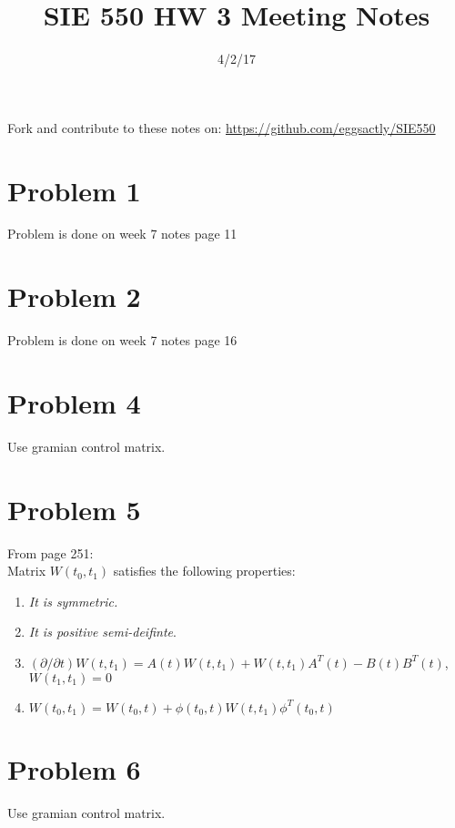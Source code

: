 \documentclass[12pt]{article}
\begin{document}
\title{SIE 550 HW 3 Meeting Notes}
\date{4/2/17}

\maketitle

Fork and contribute to these notes on: \url{https://github.com/eggsactly/SIE550}

\section*{Problem 1}
Problem is done on week 7 notes page 11

\section*{Problem 2}
Problem is done on week 7 notes page 16

\section*{Problem 4}
Use gramian control matrix. 

\section*{Problem 5} 
From page 251:\\
Matrix $W(t_0,t_1)$ satisfies the following properties:
\renewcommand{\labelenumiii}{\Roman{enumiii}}
\begin{enumerate}
  \item {\em It is symmetric.}
  \item {\em It is positive semi-deifinte}. 
  \item $(\partial/\partial t)W(t,t_1)=A(t)W(t,t_1)+W(t,t_1)A^T(t)-B(t)B^T(t)$, \\$W(t_1,t_1)=0$
  \item $W(t_0,t_1)=W(t_0,t)+\phi(t_0,t)W(t,t_1)\phi^T(t_0,t)$
\end{enumerate}

\section*{Problem 6}
Use gramian control matrix. 
\end{document}
